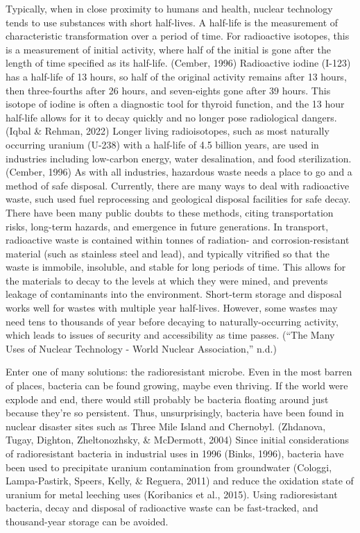 \documentclass[12pt,twoside]{reedthesis}
\begin{document}
Typically, when in close proximity to humans and health, nuclear technology tends to use substances with short half-lives. A half-life is the measurement of characteristic transformation over a period of time. For radioactive isotopes, this is a measurement of initial activity, where half of the initial is gone after the length of time specified as its half-life. (Cember, 1996) Radioactive iodine (I-123) has a half-life of 13 hours, so half of the original activity remains after 13 hours, then three-fourths after 26 hours, and seven-eights gone after 39 hours. This isotope of iodine is often a diagnostic tool for thyroid function, and the 13 hour half-life allows for it to decay quickly and no longer pose radiological dangers. (Iqbal \& Rehman, 2022) Longer living radioisotopes, such as most naturally occurring uranium (U-238) with a half-life of 4.5 billion years, are used in industries including low-carbon energy, water desalination, and food sterilization. (Cember, 1996)
As with all industries, hazardous waste needs a place to go and a method of safe disposal. Currently, there are many ways to deal with radioactive waste, such used fuel reprocessing and geological disposal facilities for safe decay. There have been many public doubts to these methods, citing transportation risks, long-term hazards, and emergence in future generations. In transport, radioactive waste is contained within tonnes of radiation- and corrosion-resistant material (such as stainless steel and lead), and typically vitrified so that the waste is immobile, insoluble, and stable for long periods of time. This allows for the materials to decay to the levels at which they were mined, and prevents leakage of contaminants into the environment. Short-term storage and disposal works well for wastes with multiple year half-lives. However, some wastes may need tens to thousands of year before decaying to naturally-occurring activity, which leads to issues of security and accessibility as time passes. (``The Many Uses of Nuclear Technology - World Nuclear Association,'' n.d.)

Enter one of many solutions: the radioresistant microbe. Even in the most barren of places, bacteria can be found growing, maybe even thriving. If the world were explode and end, there would still probably be bacteria floating around just because they're so persistent. Thus, unsurprisingly, bacteria have been found in nuclear disaster sites such as Three Mile Island and Chernobyl. (Zhdanova, Tugay, Dighton, Zheltonozhsky, \& McDermott, 2004) Since initial considerations of radioresistant bacteria in industrial uses in 1996 (Binks, 1996), bacteria have been used to precipitate uranium contamination from groundwater (Cologgi, Lampa-Pastirk, Speers, Kelly, \& Reguera, 2011) and reduce the oxidation state of uranium for metal leeching uses (Koribanics et al., 2015). Using radioresistant bacteria, decay and disposal of radioactive waste can be fast-tracked, and thousand-year storage can be avoided.
\end{document}
